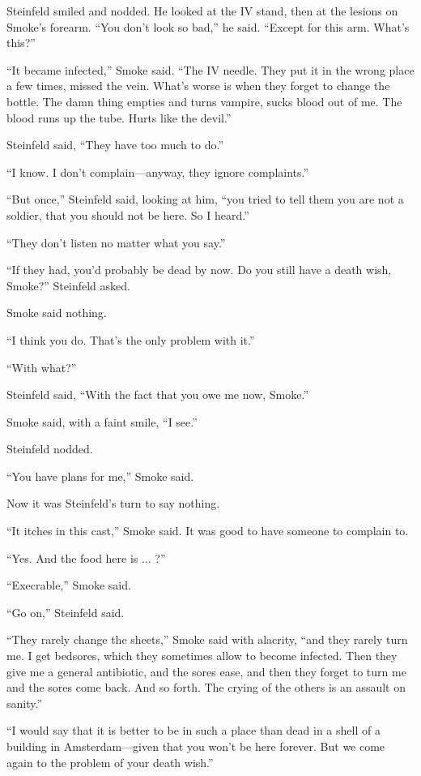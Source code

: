 Steinfeld smiled and nodded. He looked at the IV stand, then at the lesions on Smoke's forearm. ``You don't look so bad,'' he said. ``Except for this arm. What's this?''

``It became infected,'' Smoke said. ``The IV needle. They put it in the wrong place a few times, missed the vein. What's worse is when they forget to change the bottle. The damn thing empties and turns vampire, sucks blood out of me. The blood runs up the tube. Hurts like the devil.''

Steinfeld said, ``They have too much to do.''

``I know. I don't complain—anyway, they ignore complaints.''

``But once,'' Steinfeld said, looking at him, ``you tried to tell them you are not a soldier, that you should not be here. So I heard.''

``They don't listen no matter what you say.''

``If they had, you'd probably be dead by now. Do you still have a death wish, Smoke?'' Steinfeld asked.

Smoke said nothing.

``I think you do. That's the only problem with it.''

``With what?''

Steinfeld said, ``With the fact that you owe me now, Smoke.''

Smoke said, with a faint smile, ``I see.''

Steinfeld nodded.

``You have plans for me,'' Smoke said.

Now it was Steinfeld's turn to say nothing.

``It itches in this cast,'' Smoke said. It was good to have someone to complain to.

``Yes. And the food here is ... ?''

``Execrable,'' Smoke said.

``Go on,'' Steinfeld said.

``They rarely change the sheets,'' Smoke said with alacrity, ``and they rarely turn me. I get bedsores, which they sometimes allow to become infected. Then they give me a general antibiotic, and the sores ease, and then they forget to turn me and the sores come back. And so forth. The crying of the others is an assault on sanity.''

``I would say that it is better to be in such a place than dead in a shell of a building in Amsterdam—given that you won't be here forever. But we come again to the problem of your death wish.''


